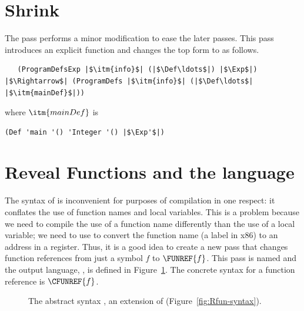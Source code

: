 \documentclass[11pt]{book}
\newcommand{\gray}[1]{{\color{gray} #1}}
\begin{document}
\section{Shrink \LangFun{}}
\label{sec:shrink-r4}

The  pass performs a minor modification to ease the
later passes. This pass introduces an explicit  function
and changes the top  form to
 as follows.
\begin{lstlisting}
   (ProgramDefsExp |$\itm{info}$| (|$\Def\ldots$|) |$\Exp$|)
|$\Rightarrow$| (ProgramDefs |$\itm{info}$| (|$\Def\ldots$| |$\itm{mainDef}$|))
\end{lstlisting}
where $\itm{mainDef}$ is
\begin{lstlisting}
(Def 'main '() 'Integer '() |$\Exp'$|)
\end{lstlisting}


\section{Reveal Functions and the \LangFunRef{} language}
\label{sec:reveal-functions-r4}

The syntax of \LangFun{} is inconvenient for purposes of compilation in one
respect: it conflates the use of function names and local
variables. This is a problem because we need to compile the use of a
function name differently than the use of a local variable; we need to
use  to convert the function name (a label in x86) to an
address in a register.  Thus, it is a good idea to create a new pass
that changes function references from just a symbol $f$ to
$\FUNREF{f}$. This pass is named  and the
output language, \LangFunRef{}, is defined in Figure~\ref{fig:f1-syntax}.
The concrete syntax for a function reference is $\CFUNREF{f}$.

\begin{figure}[tp]
\centering
\fbox{
\begin{minipage}{0.96\textwidth}
\[
\begin{array}{lcl}
\Exp &::=& \ldots \mid \FUNREF{\Var}\\
 \Def &::=& \gray{ \FUNDEF{\Var}{([\Var \code{:} \Type]\ldots)}{\Type}{\code{'()}}{\Exp} }\\
  \LangFunRef{} &::=& \PROGRAMDEFS{\code{'()}}{\LP \Def\ldots \RP}
\end{array}
\]
\end{minipage}
}
\caption{The abstract syntax \LangFunRef{}, an extension of \LangFun{}
  (Figure~\ref{fig:Rfun-syntax}).}
\label{fig:f1-syntax}
\end{figure}
\end{document}
